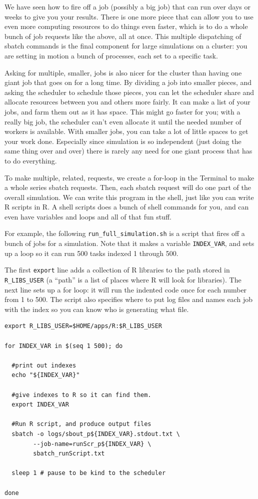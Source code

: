 \documentclass[
]{book}
\begin{document}
We have seen how to fire off a job (possibly a big job) that can run over days or weeks to give you your results.
There is one more piece that can allow you to use even more computing resources to do things even faster, which is to do a whole bunch of job requests like the above, all at once.
This multiple dispatching of sbatch commands is the final component for large simulations on a cluster: you are setting in motion a bunch of processes, each set to a specific task.

Asking for multiple, smaller, jobs is also nicer for the cluster than having one giant job that goes on for a long time.
By dividing a job into smaller pieces, and asking the scheduler to schedule those pieces, you can let the scheduler share and allocate resources between you and others more fairly.
It can make a list of your jobs, and farm them out as it has space.
This might go faster for you; with a really big job, the scheduler can't even allocate it until the needed number of workers is available.
With smaller jobs, you can take a lot of little spaces to get your work done.
Especially since simulation is so independent (just doing the same thing over and over) there is rarely any need for one giant process that has to do everything.

To make multiple, related, requests, we create a for-loop in the Terminal to make a whole series sbatch requests.
Then, each sbatch request will do one part of the overall simulation.
We can write this program in the shell, just like you can write R scripts in R.
A shell scripts does a bunch of shell commands for you, and can even have variables and loops and all of that fun stuff.

For example, the following \texttt{run\_full\_simulation.sh} is a script that fires off a bunch of jobs for a simulation.
Note that it makes a variable \texttt{INDEX\_VAR}, and sets up a loop so it can run 500 tasks indexed 1 through 500.

The first \texttt{export} line adds a collection of R libraries to the path stored in \texttt{R\_LIBS\_USER} (a ``path'' is a list of places where R will look for libraries).
The next line sets up a for loop: it will run the indented code once for each number from 1 to 500.
The script also specifies where to put log files and names each job with the index so you can know who is generating what file.

\begin{verbatim}
export R_LIBS_USER=$HOME/apps/R:$R_LIBS_USER

for INDEX_VAR in $(seq 1 500); do

  #print out indexes
  echo "${INDEX_VAR}"

  #give indexes to R so it can find them.
  export INDEX_VAR 

  #Run R script, and produce output files
  sbatch -o logs/sbout_p${INDEX_VAR}.stdout.txt \
        --job-name=runScr_p${INDEX_VAR} \
        sbatch_runScript.txt
  
  sleep 1 # pause to be kind to the scheduler

done
\end{verbatim}
\end{document}
